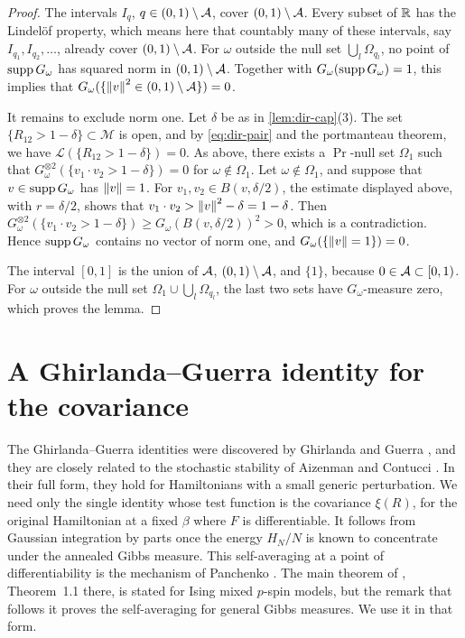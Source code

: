 \begin{proof}
The intervals $I_q$, $q\in(0,1)\setminus\mathcal A$, cover $(0,1)\setminus\mathcal A$. Every subset of $\mathbb R$ has the Lindel\"of property, which means here that countably many of these intervals, say $I_{q_1},I_{q_2},\dots$, already cover $(0,1)\setminus\mathcal A$. For $\omega$ outside the null set $\bigcup_l\Omega_{q_l}$, no point of $\operatorname{supp} G_\omega$ has squared norm in $(0,1)\setminus\mathcal A$. Together with $G_\omega(\operatorname{supp} G_\omega)=1$, this implies that $G_\omega(\{\left\lVert v\right\rVert^2\in(0,1)\setminus\mathcal A\})=0$.

It remains to exclude norm one. Let $\delta$ be as in \cref{lem:dir-cap}(3). The set $\{R_{12}>1-\delta\}\subset\mathcal M$ is open, and by \eqref{eq:dir-pair} and the portmanteau theorem, we have $\mathcal L(\{R_{12}>1-\delta\})=0$. As above, there exists a $\Pr$-null set $\Omega_1$ such that $G_\omega^{\otimes2}(\{v_1\cdot v_2>1-\delta\})=0$ for $\omega\notin\Omega_1$. Let $\omega\notin\Omega_1$, and suppose that $v\in\operatorname{supp} G_\omega$ has $\left\lVert v\right\rVert=1$. For $v_1,v_2\in B(v,\delta/2)$, the estimate displayed above, with $r=\delta/2$, shows that $v_1\cdot v_2>\left\lVert v\right\rVert^2-\delta=1-\delta$. Then $G_\omega^{\otimes2}(\{v_1\cdot v_2>1-\delta\})\ge G_\omega(B(v,\delta/2))^2>0$, which is a contradiction. Hence $\operatorname{supp} G_\omega$ contains no vector of norm one, and $G_\omega(\{\left\lVert v\right\rVert=1\})=0$.

The interval $[0,1]$ is the union of $\mathcal A$, $(0,1)\setminus\mathcal A$, and $\{1\}$, because $0\in\mathcal A\subset[0,1)$. For $\omega$ outside the null set $\Omega_1\cup\bigcup_l\Omega_{q_l}$, the last two sets have $G_\omega$-measure zero, which proves the lemma.
\end{proof}

\section{A Ghirlanda--Guerra identity for the covariance}\label{sec:dir-GG}

The Ghirlanda--Guerra identities were discovered by Ghirlanda and Guerra \cite{GhirlandaGuerra1998}, and they are closely related to the stochastic stability of Aizenman and Contucci \cite{AizenmanContucci1998}. In their full form, they hold for Hamiltonians with a small generic perturbation. We need only the single identity whose test function is the covariance $\xi(R)$, for the original Hamiltonian at a fixed $\beta$ where $F$ is differentiable. It follows from Gaussian integration by parts once the energy $H_N/N$ is known to concentrate under the annealed Gibbs measure. This self-averaging at a point of differentiability is the mechanism of Panchenko \cite{Panchenko2010GG}. The main theorem of \cite{Panchenko2010GG}, Theorem~1.1 there, is stated for Ising mixed $p$-spin models, but the remark that follows it proves the self-averaging for general Gibbs measures. We use it in that form.

